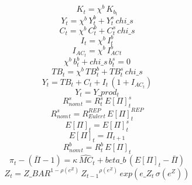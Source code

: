 \begin{dmath}
{K_{t}}={\chi^b }\, {K_b_{t}}
\end{dmath}
\begin{dmath}
{Y_{t}}={\chi^b }\, {Y^b_{t}}+{Y^s_{t}}\, {chi\_s}
\end{dmath}
\begin{dmath}
{C_{t}}={\chi^b }\, {C^b_{t}}+{C^s_{t}}\, {chi\_s}
\end{dmath}
\begin{dmath}
{I_{t}}={\chi^b }\, {I^b_{t}}
\end{dmath}
\begin{dmath}
{I_{AC}_{t}}={\chi^b }\, {I_{AC}^b_{t}}
\end{dmath}
\begin{dmath}
{\chi^b }\, {b^b_{t}}+{chi\_s}\, {b^s_{t}}=0
\end{dmath}
\begin{dmath}
{TB_{t}}={\chi^b }\, {TB^b_{t}}+{TB^s_{t}}\, {chi\_s}
\end{dmath}
\begin{dmath}
{Y_{t}}={TB_{t}}+{C_{t}}+{I_{t}}\, \left(1+{I_{AC}_{t}}\right)
\end{dmath}
\begin{dmath}
{Y_{t}}={Y\_prod_{t}}
\end{dmath}
\begin{dmath}
{ R^s_{nom}_{t}}={R^s_{t}}\, { E[\Pi]^{s} _{t}}
\end{dmath}
\begin{dmath}
{ R^s_{nom}_{t}}={ R^{REP}_{Euler} _{t}}\, { E[\Pi]^{REP} _{t}}
\end{dmath}
\begin{dmath}
{ E[\Pi] _{t}}={ E[\Pi]^{s} _{t}}
\end{dmath}
\begin{dmath}
{ E[\Pi] _{t}}={ \Pi _{t+1}}
\end{dmath}
\begin{dmath}
{ R^b_{nom}_{t}}={R^b_{t}}\, { E[\Pi] _{t}}
\end{dmath}
\begin{dmath}
{ \pi _{t}}-\left({ \bar{\Pi} }-1\right)={\kappa}\, { \hat{MC} _{t}}+{beta\_b}\, \left({ E[\Pi] _{t}}-{ \bar{\Pi} }\right)
\end{dmath}
\begin{dmath}
{Z_{t}}={Z\_BAR}^{1-{ \rho(e^Z) }}\, {Z_{t-1}}^{{ \rho(e^Z) }}\, exp\left({e\_Z_{t}}\, { \sigma(e^Z) }\right)
\end{dmath}

